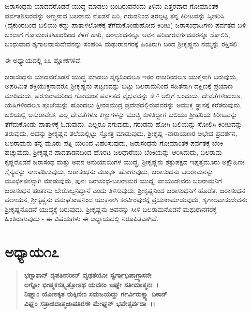 ಜರಾಸಂಧನು ಯಾದವರೊಡನೆ ಯುದ್ಧ ಮಾಡಲು ಬಂದಿರುವನೆಂದು ತಿಳಿದು ಎತ್ತರವಾದ ಗೋಮಾಂತಕ ಪರ್ವತಶಿಖರವನ್ನು ಅಣ್ಣನಾದ ಬಲರಾಮ ನೊಡನೆ ಏರಿ, ಗರುಡನಿಂದ ತರಲ್ಪಟ್ಟ ತನ್ನ ಕಿರೀಟವನ್ನು ಸ್ವೀಕರಿಸಿ (ವೈಕುಂಠದಿಂದ ಬಲಿಯು ಕದ್ದು ಪಾತಾಳಲೋಕಕ್ಕೆ ತೆಗೆದುಕೊಂಡುಹೋದ ಕಿರೀಟ) ಜರಾಸಂಧಾದಿಗಳು ಪರ್ವತದ ಬಳಿ ಬಂದಾಗ ಗೋಮಂತಕಶಿಖರದಿಂದ ಕೆಳಗೆ ಹಾರಿ, ಜರಾಸಂಧನನ್ನೂ ಅವನ ಪರಿವಾರವರ್ಗದವರನ್ನೂ ಸೋಲಿಸಿ, ಬಂಧುವಾದ ಶೃಗಾಲವಾಸುದೇವನನ್ನು ಸಂಹರಿಸಿ ಮಥುರಾನಗರಕ್ಕೆ ಹಿಂತಿರುಗಿ ಬಂದ ಶ‍್ರೀಕೃಷ್ಣನು ನಮ್ಮನ್ನು ರಕ್ಷಿಸಲಿ.

ಈ ಅಧ್ಯಾಯದಲ್ಲಿ ೩೩ ಶ್ಲೋಕಗಳಿವೆ.

ಜರಾಸಂಧನು ಯಾದವರೊಡನೆ ಯುದ್ಧ ಮಾಡಲು ಸೈನ್ಯದಿಂದಲೂ ಇತರ ರಾಜರಿಂದಲೂ ಯುಕ್ತನಾಗಿ ಬರುವುದು, ಅಪರಿಮಿತ ಶಕ್ತಿಯುಕ್ತನಾದರೂ ಶ‍್ರೀಕೃಷ್ಣನು ಪಟ್ಟಣ\-ವನ್ನು ಬಿಟ್ಟು ಬಲರಾಮನಿಂದ ಸಹಿತನಾಗಿ ದಕ್ಷಿಣಕ್ಕೆ ಪ್ರಯಾಣ ಮಾಡಿದುದು, ಪರಶುರಾಮರಿಂದ ಗೋಮಂತ ಪರ್ವತದ ವೈಭವವನ್ನು ಕೇಳಿ ಅಲ್ಲಿಗೆ ಬಂದುದು, ದೇವತೆಗಳಿಂದಲೂ, ಋಷಿಗಳಿಂದಲೂ ಪೂಜೆಯನ್ನು ಹೊಂದಲು ಕ್ಷೀರಸಮುದ್ರ ಪ್ರದೇಶದಲ್ಲಿರುವವರನ್ನು ಅಮುಕ್ತ ಸ್ಥಾನಕ್ಕೆ ಕರೆತರುವುದು, ಬಲಿಯಲ್ಲಿ ಅಸುರಾವೇಶ, ಎಲ್ಲ ದೇವತೆಗಳೂ ಕಣ್ಣುಗಳನ್ನು ಮುಚ್ಚಿ ಕುಳಿತಿದ್ದಾಗ ಬಲಿಯು ಶ‍್ರೀಹರಿಯ ಕಿರೀಟವನ್ನು ತೆಗೆದುಕೊಂಡು ಪಾತಾಳಕ್ಕೆ ಓಡುವುದು, ಎಲ್ಲರೂ ನಗುವುದು, ಗರುಡನು ಹೋಗಿ ಬಲಿಯನ್ನು ಸೋಲಿಸಿ ಕಿರೀಟವನ್ನು ತರುವುದು, ಅದನ್ನು ಶ‍್ರೀಕೃಷ್ಣನ ತಲೆಯಲ್ಲಿಟ್ಟು ಸ್ತೋತ್ರ ಮಾಡುವುದು, ಶ‍್ರೀಕೃಷ್ಣ -\break ನಾರಾಯಣರ ಅಭೇದ ಪ್ರದರ್ಶನ, ಬಲರಾಮನು ತನ್ನ ಮೂರು ಪತ್ನಿ ಯರಿಂದ ವಿಹರಿಸುವುದು, ಜರಾಸಂಧನು ಗೋಮಾಂತಕ ಪರ್ವತಕ್ಕೆ ಬೆಂಕಿ ಹಚ್ಚುವುದು, ಶ‍್ರೀಕೃಷ್ಣನ ಪಾದತಾಡನದಿಂದ ಹೊರಟ ಜಲಧಾರೆಯು ಬೆಂಕಿಯನ್ನು ಆರಿಸಿದುದು, ಬಲರಾಮ ಕೃಷ್ಣರೊಡನೆ ಜರಾಸಂಧ ಮತ್ತು ಅವನ ಅನುಯಾಯಿಗಳ ಯುದ್ಧ, ಶ‍್ರೀಕೃಷ್ಣನು ಶತ್ರುಪಕ್ಷದ ಇಪ್ಪತ್ತಮೂರು ಅಕ್ಷೌಹಿಣೀ ಸೈನ್ಯವನ್ನು ನಾಶಪಡಿಸುವುದು, ಜರಾಸಂಧನು ಮೂರ್ಛ ಹೋಗುವುದು, ಜರಾಸಂಧನು ಬಲರಾಮನನ್ನು ಮೂರ್ಛಿತನನ್ನಾಗಿ ಮಾಡುವುದು, ಪುನಃ ಜರಾಸಂಧ-ಬಲರಾಮರ ಯುದ್ದ, ವಾಯುದೇವರು ಬಲರಾಮನಿಗೆ ಜರಾಸಂಧನ ಹಂತಕನು ಬೇರೊಬ್ಬನಿದ್ದಾನೆ ಎಂದು ತಿಳಿಸುವುದು, ಶ‍್ರೀಕೃಷ್ಣನಿಂದ ಜರಾಸಂಧನಿಗೆ ಹೊಡೆತ, ಜರಾಸಂಧನ ಪಲಾಯನ, ಶ‍್ರೀಕೃಷ್ಣನು ದಮಘೋಷನಿಂದ ಯುಕ್ತನಾಗಿ ಕರವೀರಪುರಕ್ಕೆ ಪ್ರಯಾಣಮಾಡುವುದು, ಶೃಗಾಲವಾಸುದೇವನು ಶ‍್ರೀಕೃಷ್ಣನೊಡನೆ ಯುದ್ಧಕ್ಕೆ ಬರುವುದು. ಶ‍್ರೀಕೃಷ್ಣನು ಅವನನ್ನು ಸೀಳಿ ಬಲರಾಮನೊಡನೆ ಮಥುರಾನಗರಕ್ಕೆ ಹಿಂತಿರುಗುವುದು - ಈ ವಿಷಯಗಳು ಈ ಅಧ್ಯಾಯದಲ್ಲಿ ನಿರೂಪಿತವಾಗಿವೆ.


\section*{ಅಧ್ಯಾಯ\enginline{-}೧೭}

\begin{verse}
\textbf{ಭಗ್ನಾಶಾನ್ ನೃಪತೀನರೀನ್ ವ್ಯಥತಯೋ ಸ್ವರ್ಗಾಧಿಪಾಗ್ರ್ಯಾಸನೇ} \\\textbf{ಲಗ್ನೋ ಭೀಷ್ಮಕಸತ್ಕೃತ್ತೋಽಥ ಯವನಂ ಜಘ್ನೇ ಸತೀಮಾತ್ಮನಃ~।}\\\textbf{ ನಿಘ್ನಾಂ ಯೋಽಕೃತ ರುಕ್ಕಿಣೀಂ ಸಮಜಯದ್ದು ರ್ಗರ್ವಿರುಕ್ಮ್ಯಾ ದಿಕಾನ್} \\\textbf{ವಿಘ್ನಂ ಸತ್ರಾಜಿದಾತ್ಮಜಾಪತಿರಸೌ ಮೇಘ್ನನ್ ಭವೇತ್ಸರ್ವದಾ~।।}
\end{verse}

